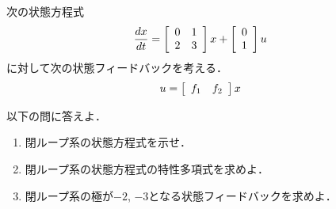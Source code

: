 \item
次の状態方程式
\begin{align}
	\frac{dx}{dt} 
	& =	\bmatrix{rr}
			0 & 1 \\
			2 & 3
		\ematrix
		x
		+
		\bmatrix{c}
			0 \\
			1
		\ematrix
		u 
\nonumber
\end{align}
に対して次の状態フィードバックを考える．
\begin{align}
	u & = \bmatrix{cc} f_1 & f_2 \ematrix x
\nonumber
\end{align}

以下の問に答えよ．
\begin{enumerate}
\item
閉ループ系の状態方程式を示せ．
\vspace{6cm}

\item
閉ループ系の状態方程式の特性多項式を求めよ．
\vspace{6cm}

\item
閉ループ系の極が$-2$, $-3$となる状態フィードバックを求めよ．
\vspace{9cm}

\end{enumerate}

